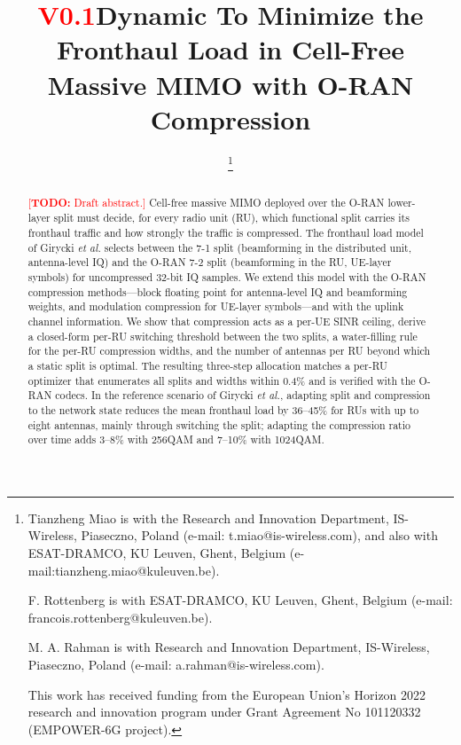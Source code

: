 \documentclass[10pt, final, journal, letterpaper, twocolumn]{IEEEtran}
\newcommand{\draftversion}{\textcolor{red}{V0.1}}
\newcommand{\todo}[1]{\textcolor{red}{[\textbf{TODO:} #1]}}
\begin{document}
\title{\draftversion \quad Dynamic To Minimize the Fronthaul Load in Cell-Free Massive MIMO with O-RAN Compression}

\author{
    
    \thanks{
      Tianzheng Miao is with the Research and Innovation Department, IS-Wireless, Piaseczno, Poland (e-mail: t.miao@is-wireless.com), and also with ESAT-DRAMCO, KU Leuven, Ghent, Belgium (e-mail:tianzheng.miao@kuleuven.be).

      F. Rottenberg is with ESAT-DRAMCO, KU Leuven, Ghent, Belgium (e-mail: francois.rottenberg@kuleuven.be).

      M. A. Rahman is with Research and Innovation Department, IS-Wireless, Piaseczno, Poland (e-mail: a.rahman@is-wireless.com).

      This work has received funding from the European Union's Horizon 2022 research and innovation program under Grant Agreement No 101120332 (EMPOWER-6G project).
    }
}

\maketitle

\begin{abstract}
\todo{Draft abstract.} Cell-free massive MIMO deployed over the O-RAN lower-layer split must decide, for every radio unit (RU), which functional split carries its fronthaul traffic and how strongly the traffic is compressed. The fronthaul load model of Girycki \emph{et al.} selects between the 7-1 split (beamforming in the distributed unit, antenna-level IQ) and the O-RAN 7-2 split (beamforming in the RU, UE-layer symbols) for uncompressed 32-bit IQ samples. We extend this model with the O-RAN compression methods---block floating point for antenna-level IQ and beamforming weights, and modulation compression for UE-layer symbols---and with the uplink channel information. We show that compression acts as a per-UE SINR ceiling, derive a closed-form per-RU switching threshold between the two splits, a water-filling rule for the per-RU compression widths, and the number of antennas per RU beyond which a static split is optimal. The resulting three-step allocation matches a per-RU optimizer that enumerates all splits and widths within 0.4\% and is verified with the O-RAN codecs. In the reference scenario of Girycki \emph{et al.}, adapting split and compression to the network state reduces the mean fronthaul load by 36--45\% for RUs with up to eight antennas, mainly through switching the split; adapting the compression ratio over time adds 3--8\% with 256QAM and 7--10\% with 1024QAM.
\end{abstract}
\end{document}

